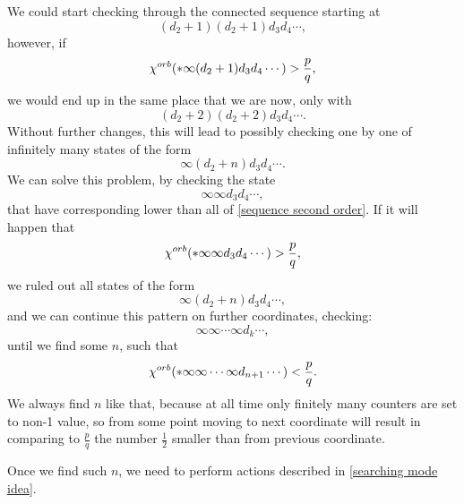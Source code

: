 We could start checking through the connected sequence starting at 
\begin{equation}
(d_2+1)(d_2+1)d_3d_4\cdots, 
\end{equation}
however, if 
\begin{equation}
{\chi^{orb}(*\infty(d_2+1)d_3d_4\cdots)} > \frac{p}{q}, 
\end{equation}
we would end up in the same place that we are now, only with 
\begin{equation}
(d_2+2)(d_2+2)d_3d_4\cdots.
\end{equation}
Without further changes, this will lead to possibly checking one by one of infinitely many states 
of the form 
\begin{equation}\label{sequence second order}
\infty(d_2+n)d_3d_4\cdots. 
\end{equation}
We can solve this problem, by checking the state 
\begin{equation}
\infty\infty d_3d_4\cdots, 
\end{equation}
that have corresponding \Eoc lower than all of \ref{sequence second order}. 
If it will happen that 
\begin{equation}
{\chi^{orb}(*\infty\infty d_3d_4\cdots)} > \frac{p}{q},
\end{equation}
we ruled out all states of the form
\begin{equation}
\infty(d_2+n)d_3d_4\cdots,
\end{equation}
and we can continue this pattern on further coordinates, checking: 
\begin{equation}
\infty\infty \cdots \infty d_k\cdots, 
\end{equation}
until we find some $n$, such that
\begin{equation}
{\chi^{orb}(*\infty\infty \cdots \infty d_{n+1}\cdots)} < \frac{p}{q}.
\end{equation}
We always find $n$ like that, because at all time only finitely many counters are set 
to non-1 value, so from some point moving to next coordinate will result in 
comparing to $\frac{p}{q}$ the number $\frac{1}{2}$ smaller than from previous coordinate. 

Once we find such $n$, we need to perform actions described in \ref{searching mode idea}.  


